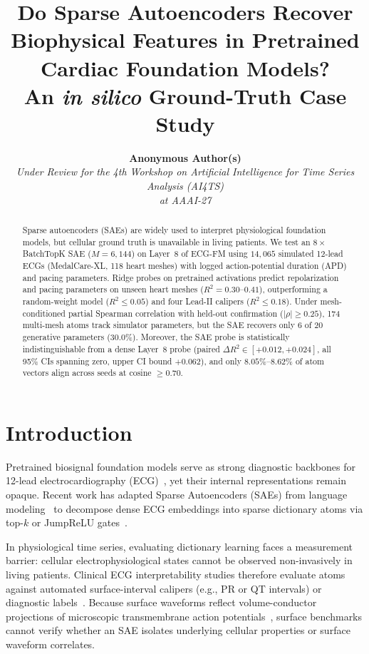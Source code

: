 \documentclass[10pt,twocolumn,letterpaper]{article}
\title{\textbf{Do Sparse Autoencoders Recover Biophysical Features in Pretrained Cardiac Foundation Models?\\An \textit{in silico} Ground-Truth Case Study}}
\author{
  \textbf{Anonymous Author(s)}\\
  \textit{Under Review for the 4th Workshop on Artificial Intelligence for Time Series Analysis (AI4TS)}\\
  \textit{at AAAI-27}
}
\date{}
\begin{document}
\maketitle

\begin{abstract}
Sparse autoencoders (SAEs) are widely used to interpret physiological foundation models, but cellular ground truth is unavailable in living patients. We test an $8\times$ BatchTopK SAE ($M = 6{,}144$) on Layer~8 of ECG-FM using $14{,}065$ simulated 12-lead ECGs (MedalCare-XL, 118 heart meshes) with logged action-potential duration (APD) and pacing parameters. Ridge probes on pretrained activations predict repolarization and pacing parameters on unseen heart meshes ($R^2 = 0.30\text{--}0.41$), outperforming a random-weight model ($R^2 \le 0.05$) and four Lead-II calipers ($R^2 \le 0.18$). Under mesh-conditioned partial Spearman correlation with held-out confirmation ($|\rho| \ge 0.25$), 174 multi-mesh atoms track simulator parameters, but the SAE recovers only 6 of 20 generative parameters (30.0\%). Moreover, the SAE probe is statistically indistinguishable from a dense Layer~8 probe (paired $\Delta R^2 \in [+0.012, +0.024]$, all 95\% CIs spanning zero, upper CI bound $+0.062$), and only $8.05\%\text{--}8.62\%$ of atom vectors align across seeds at cosine $\ge 0.70$.
\end{abstract}

\section{Introduction}
Pretrained biosignal foundation models serve as strong diagnostic backbones for 12-lead electrocardiography (ECG)~\cite{mckeen2025ecgfm,wagner2020ptbxl}, yet their internal representations remain opaque. Recent work has adapted Sparse Autoencoders (SAEs) from language modeling~\cite{bricken2023towards,cunningham2023sparse,karvonen2025saebench} to decompose dense ECG embeddings into sparse dictionary atoms via top-$k$ or JumpReLU gates~\cite{bussmann2024batchtopk,rajamanoharan2024jumprelu}.

In physiological time series, evaluating dictionary learning faces a measurement barrier: cellular electrophysiological states cannot be observed non-invasively in living patients. Clinical ECG interpretability studies therefore evaluate atoms against automated surface-interval calipers (e.g., PR or QT intervals) or diagnostic labels~\cite{duan2026cadence,duan2026ecginterpbench}. Because surface waveforms reflect volume-conductor projections of microscopic transmembrane action potentials~\cite{clayton2011models,macfarlane2010comprehensive}, surface benchmarks cannot verify whether an SAE isolates underlying cellular properties or surface waveform correlates.
\end{document}
